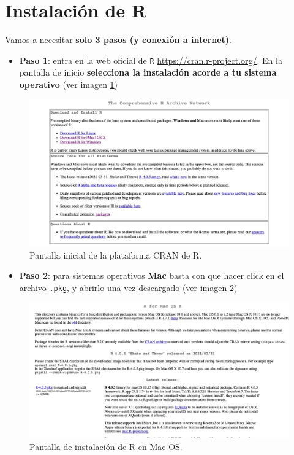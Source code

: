 \documentclass[11pt,]{book}
\providecommand{\tightlist}{%
  \setlength{\itemsep}{0pt}\setlength{\parskip}{0pt}}
\begin{document}
\hypertarget{instalacionR}{%
\section{Instalación de R}\label{instalacionR}}

Vamos a necesitar \textbf{solo 3 pasos (y conexión a internet)}.

\begin{itemize}
\tightlist
\item
  \textbf{Paso 1}: entra en la web oficial de \texttt{R} \url{https://cran.r-project.org/}. En la pantalla de inicio \textbf{selecciona la instalación acorde a tu sistema operativo} (ver imagen \ref{fig:pantalla-cran})
\end{itemize}

\begin{figure}

{\centering \includegraphics[width=0.8\linewidth]{./img/pantalla1_cran} 

}

\caption{Pantalla inicial de la plataforma CRAN de R.}\label{fig:pantalla-cran}
\end{figure}

\begin{itemize}
\tightlist
\item
  \textbf{Paso 2}: para sistemas operativos \textbf{Mac} basta con que hacer click en el archivo \texttt{.pkg}, y abrirlo una vez descargado (ver imagen \ref{fig:pantalla-mac})
\end{itemize}

\begin{figure}

{\centering \includegraphics[width=0.9\linewidth]{./img/pantall_mac_cran} 

}

\caption{Pantalla de instalación de R en Mac OS.}\label{fig:pantalla-mac}
\end{figure}
\end{document}
